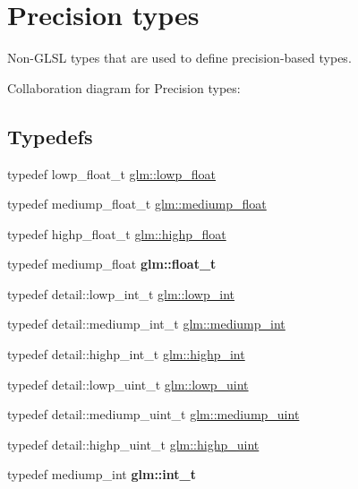 \hypertarget{group__core__precision}{\section{Precision types}
\label{group__core__precision}
}


Non-\/\-G\-L\-S\-L types that are used to define precision-\/based types.  


Collaboration diagram for Precision types\-:
\subsection*{Typedefs}
\begin{DoxyCompactItemize}
\item 
typedef lowp\-\_\-float\-\_\-t \hyperlink{group__core__precision_ga2887fbc729ac5c1c5caeb7cd57a7145c}{glm\-::lowp\-\_\-float}
\item 
typedef mediump\-\_\-float\-\_\-t \hyperlink{group__core__precision_gac785826c039fe6c97c03b37c81c1a68e}{glm\-::mediump\-\_\-float}
\item 
typedef highp\-\_\-float\-\_\-t \hyperlink{group__core__precision_ga3d443a093adc053638ed7f81c5bfe300}{glm\-::highp\-\_\-float}
\item 
\hypertarget{group__core__precision_gae01b87f81bd15327230bf1b47c482b24}{typedef mediump\-\_\-float {\bfseries glm\-::float\-\_\-t}}\label{group__core__precision_gae01b87f81bd15327230bf1b47c482b24}

\item 
typedef detail\-::lowp\-\_\-int\-\_\-t \hyperlink{group__core__precision_ga4681244bf4a184734f03aa9df4e3d288}{glm\-::lowp\-\_\-int}
\item 
typedef detail\-::mediump\-\_\-int\-\_\-t \hyperlink{group__core__precision_ga2a3dcbcd7f4e17663d393a12061ac6ac}{glm\-::mediump\-\_\-int}
\item 
typedef detail\-::highp\-\_\-int\-\_\-t \hyperlink{group__core__precision_gaafed5240eb0a43328cb75faf5fb0a8c2}{glm\-::highp\-\_\-int}
\item 
typedef detail\-::lowp\-\_\-uint\-\_\-t \hyperlink{group__core__precision_ga8077c90f2c87e419ea6c273157dcc1fc}{glm\-::lowp\-\_\-uint}
\item 
typedef detail\-::mediump\-\_\-uint\-\_\-t \hyperlink{group__core__precision_ga08ae38ad78ade3539fdd1d25052b8c51}{glm\-::mediump\-\_\-uint}
\item 
typedef detail\-::highp\-\_\-uint\-\_\-t \hyperlink{group__core__precision_gabfd1cf11193324a5f77d3831b6ac3205}{glm\-::highp\-\_\-uint}
\item 
\hypertarget{group__core__precision_gacd01d170508f812968875b0f2e730e8c}{typedef mediump\-\_\-int {\bfseries glm\-::int\-\_\-t}}\label{group__core__precision_gacd01d170508f812968875b0f2e730e8c}


\end{DoxyCompactItemize}
